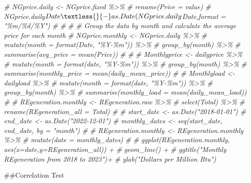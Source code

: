 \documentclass[
]{article}
\newenvironment{Shaded}{\begin{snugshade}}{\end{snugshade}}
\newcommand{\CommentTok}[1]{\textcolor[rgb]{0.56,0.35,0.01}{\textit{#1}}}
\begin{document}
\begin{Shaded}
\begin{Highlighting}[]
\CommentTok{\# NGprice.daily \textless{}{-} NGprice.fixed \%\textgreater{}\%}
\CommentTok{\#   rename(Price = value)}
\CommentTok{\# NGprice.daily$Date \textless{}{-}as.Date(NGprice.daily$Date,format = "\%m/\%d/\%Y")}
\CommentTok{\# }
\CommentTok{\# }
\CommentTok{\# \# Group the data by month and calculate the average price for each month}
\CommentTok{\# NGprice.monthly \textless{}{-} NGprice.daily \%\textgreater{}\%}
\CommentTok{\#   mutate(month = format(Date, "\%Y{-}\%m")) \%\textgreater{}\%}
\CommentTok{\#   group\_by(month) \%\textgreater{}\%}
\CommentTok{\#   summarise(avg\_price = mean(Price))}
\CommentTok{\# }
\CommentTok{\# }
\CommentTok{\# Monthlyprice \textless{}{-} dailyprice \%\textgreater{}\%}
\CommentTok{\#   mutate(month = format(date, "\%Y{-}\%m")) \%\textgreater{}\%}
\CommentTok{\#   group\_by(month) \%\textgreater{}\%}
\CommentTok{\#   summarise(monthly\_price = mean(daily\_mean\_price))}
\CommentTok{\# }
\CommentTok{\# Monthlyload \textless{}{-} dailyload \%\textgreater{}\%}
\CommentTok{\#   mutate(month = format(date, "\%Y{-}\%m")) \%\textgreater{}\%}
\CommentTok{\#   group\_by(month) \%\textgreater{}\%}
\CommentTok{\#   summarise(monthly\_load = mean(daily\_mean\_load))}
\CommentTok{\# }
\CommentTok{\# REgeneration.monthly \textless{}{-} REgeneration.raw \%\textgreater{}\% }
\CommentTok{\#   select(Total) \%\textgreater{}\%}
\CommentTok{\#   rename(REgeneration\_all = Total)}
\CommentTok{\# }
\CommentTok{\# start\_date \textless{}{-} as.Date("2018{-}01{-}01")}
\CommentTok{\# end\_date \textless{}{-} as.Date("2022{-}12{-}01")}
\CommentTok{\# monthly\_dates \textless{}{-} seq(start\_date, end\_date, by = "month")}
\CommentTok{\# }
\CommentTok{\# REgeneration.monthly \textless{}{-} REgeneration.monthly \%\textgreater{}\% }
\CommentTok{\#   mutate(date = monthly\_dates)}
\CommentTok{\# }
\CommentTok{\# ggplot(REgeneration.monthly, aes(x=date,y=REgeneration\_all)) +}
\CommentTok{\#   geom\_line() +}
\CommentTok{\#   ggtitle("Monthly REgeneration from 2018 to 2023")+}
\CommentTok{\#   ylab("Dollars per Million Btu")}
\end{Highlighting}
\end{Shaded}

\#\#Correlation Test
\end{document}
